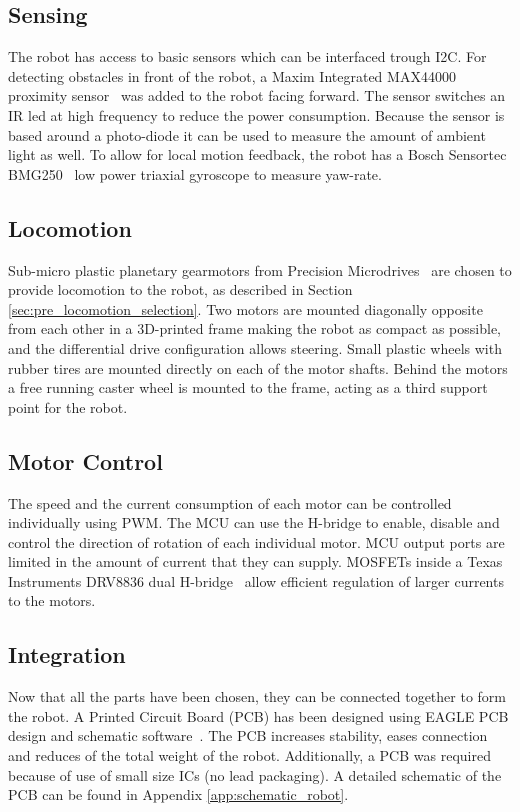 \subsection{Sensing}
\label{sec:dai_sensing}

The robot has access to basic sensors which can be interfaced trough I2C.
For detecting obstacles in front of the robot, a Maxim Integrated MAX44000 proximity sensor~\cite{max44000_2017} was added to the robot facing forward.
The sensor switches an IR led at high frequency to reduce the power consumption.
Because the sensor is based around a photo-diode it can be used to measure the amount of ambient light as well.
To allow for local motion feedback, the robot has a Bosch Sensortec BMG250~\cite{bosch_bmg250_2017} low power triaxial gyroscope to measure yaw-rate.

\subsection{Locomotion}

Sub-micro plastic planetary gearmotors from Precision Microdrives~\cite{gearmotor_206-110_2017} are chosen to provide locomotion to the robot, as described in Section \ref{sec:pre_locomotion_selection}.
Two motors are mounted diagonally opposite from each other in a 3D-printed frame making the robot as compact as possible, and the differential drive configuration allows steering.
Small plastic wheels with rubber tires are mounted directly on each of the motor shafts.
Behind the motors a free running caster wheel is mounted to the frame, acting as a third support point for the robot.

\subsection{Motor Control}
\label{sec:dai_motor_control}

The speed and the current consumption of each motor can be controlled individually using PWM.
The MCU can use the H-bridge to enable, disable and control the direction of rotation of each individual motor.
MCU output ports are limited in the amount of current that they can supply.
MOSFETs inside a Texas Instruments DRV8836 dual H-bridge~\cite{drv8836_2017} allow efficient regulation of larger currents to the motors.

\subsection{Integration}
Now that all the parts have been chosen, they can be connected together to form the robot.
A Printed Circuit Board (PCB) has been designed using EAGLE PCB design and schematic software~\cite{eagle_pcb_2017}.
The PCB increases stability, eases connection and reduces of the total weight of the robot.
Additionally, a PCB was required because of use of small size ICs (no lead packaging).
A detailed schematic of the PCB can be found in Appendix \ref{app:schematic_robot}.

